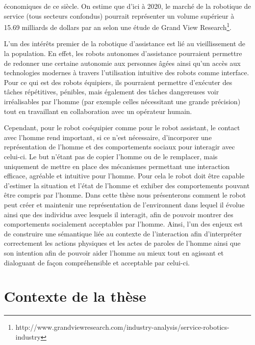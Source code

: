 \documentclass[a4paper,11pt,twoside]{StyleThese}
\begin{document}
économiques de ce siècle. On estime que d’ici à 2020, le marché de la robotique de service (tous secteurs confondus) pourrait représenter un volume supérieur à 15.69 milliards de dollars par an selon une étude de Grand View Research\footnote{http://www.grandviewresearch.com/industry-analysis/service-robotics-industry}. 

L'un des intérêts premier de la robotique d'assistance est lié au vieillissement de la population. En effet, les robots autonomes d'assistance pourraient permettre de redonner une certaine autonomie aux personnes âgées ainsi qu'un accès aux technologies modernes à travers l'utilisation intuitive des robots comme interface.
Pour ce qui est des robots équipiers, ils pourraient permettre d'exécuter des tâches répétitives, pénibles, mais également des tâches dangereuses voir irréalisables par l'homme (par exemple celles nécessitant une grande précision) tout en travaillant en collaboration avec un opérateur humain. 

Cependant, pour le robot coéquipier comme pour le robot assistant, le contact avec l'homme rend important, si ce n'est nécessaire, d'incorporer une représentation de l'homme et des comportements sociaux pour interagir avec celui-ci. Le but n'étant pas de copier l'homme ou de le remplacer, mais uniquement de mettre en place des mécanismes permettant une interaction efficace, agréable et intuitive pour l'homme. Pour cela le robot doit être capable d'estimer la situation et l'état de l'homme et exhiber des comportements pouvant être compris par l'homme. Dans cette thèse nous présenterons comment le robot peut créer et maintenir une représentation de l'environnent dans lequel il évolue ainsi que des individus avec lesquels il interagit, afin de pouvoir montrer des comportements socialement acceptables par l'homme. Ainsi, l'un des enjeux est de construire une sémantique liée au contexte de l'interaction afin d'interpréter correctement les actions physiques et les actes de paroles de l'homme ainsi que son intention afin de pouvoir aider l'homme au mieux tout en agissant et dialoguant de façon compréhensible et acceptable par celui-ci.

\section{Contexte de la thèse}
\end{document}
